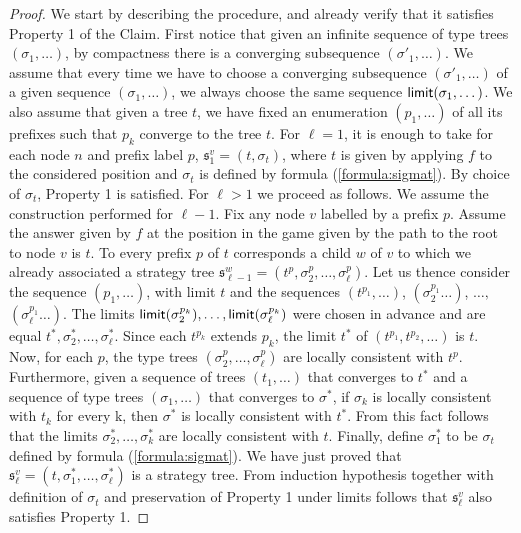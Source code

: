 \begin{proof}
We start by describing the procedure, and already verify that it satisfies Property 1 of the Claim. First notice that given an infinite sequence of type trees $(\sigma_1, \dots)$, by compactness there is a converging subsequence $(\sigma'_1, \dots)$. We assume that every time we have to choose  
a converging subsequence $(\sigma'_1, \dots)$ of a given sequence $(\sigma_1, \dots)$, we always choose the same sequence
$\mathsf{limit}(\sigma_1, \dots)$. We also assume that given a tree $t$, we have fixed an enumeration $(p_1, \dots)$ of all its prefixes such 
that $p_k$ converge to the tree $t$.
For $\ell=1$, 
it is enough to take for each node $n$ and prefix label $p$, $\mathfrak{s}^v_1=(t, \sigma_t)$, where $t$ is given by applying $f$ to the considered position and $\sigma_t$ is defined by formula (\ref{formula:sigmat}). By choice of $\sigma_t$, Property 1 is satisfied.
For $\ell>1$ we proceed as follows. We assume the construction performed for $\ell-1$. Fix any node $v$ labelled by a prefix $p$. Assume the answer given by $f$  at the position in the game given by the path to the root to node $v$ is $t$. To every prefix $p$ of $t$ corresponds a child $w$ of $v$ to which we already associated a strategy tree $\mathfrak{s}^w_{\ell-1}=(t^p, \sigma^p_{2}, \dots, \sigma^p_{\ell})$. 
Let us thence consider the sequence $(p_1, \dots)$, with limit $t$ and the sequences
$(t^{p_1}, \dots)$, $(\sigma^{p_1}_2\dots)$, $\dots,$  $(\sigma^{p_1}_{\ell}\dots)$.  The limits $\mathsf{limit}(\sigma^{p_k}_2),\dots,
\mathsf{limit}(\sigma^{p_k}_{\ell})$ were chosen in advance and are equal $t^*, \sigma^*_2, \dots, \sigma^*_\ell$. Since each $t^{p_k}$ extends $p_k$, the limit $t^*$ of  $(t^{p_1},t^{p_2},\dots)$ is $t$.
Now, for each $p$, the type trees $(\sigma^p_{2}, \dots, \sigma^p_{\ell})$
are locally consistent with $t^p$. Furthermore, given a sequence of trees $(t_1, \dots)$  that converges to $t^*$ and a sequence of type trees $(\sigma_1, \dots)$  that converges to $\sigma^*$, if $\sigma_k$ is locally consistent with $t_k$ for every k, then $\sigma^*$ is locally consistent with $t^*$.
From this fact follows that the limits $\sigma^*_2, \dots, \sigma^*_k$ are locally consistent with $t$. Finally, define $\sigma^*_1$ to be $\sigma_t$ defined by formula (\ref{formula:sigmat}). We have just proved that
$\mathfrak{s}^v_\ell = (t, \sigma^*_1, \dots, \sigma^*_\ell)$
is a strategy tree. From induction hypothesis together with definition of $\sigma_t$ and preservation of Property 1 under limits follows that $\mathfrak{s}^v_\ell$ also 
satisfies Property 1. 


\end{proof}
